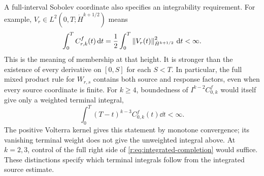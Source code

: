 A full-interval Sobolev coordinate also specifies an integrability
requirement. For example, \(V_r\in L^2(0,T;\dot H^{k+1/2})\) means
\[
 \int_0^T C^f_{r,k}(t)\,\mathrm d t
 =\frac12\int_0^T\left\lVert V_r(t)\right\rVert_{\dot H^{k+1/2}}^2\,\mathrm d t<\infty.
\]
This is the meaning of membership at that height. It is stronger than
the existence of every derivative on \([0,S]\) for each \(S<T\).
In particular, the full mixed product rule for \(W_{r,s}\) contains both
source and response factors, even when every source coordinate is finite.
For \(k\ge4\), boundedness of \(I^{k-2}C^f_{0,k}\) would itself give
only a weighted terminal integral,
\[
 \int_0^T(T-t)^{k-3}C^f_{0,k}(t)\dd t<\infty.
\]
The positive Volterra kernel gives this statement by monotone convergence;
its vanishing terminal weight does not give the unweighted integral above.
At \(k=2,3\), control of the full right side of
\eqref{r:eq:integrated-completion} would suffice. These distinctions specify which terminal integrals follow from
the integrated source estimate.
